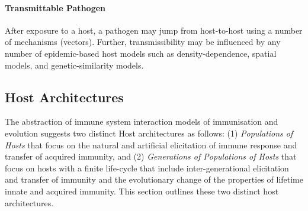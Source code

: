 \paragraph{Transmittable Pathogen}
After exposure to a host, a pathogen may jump from host-to-host using a number of mechanisms (vectors). Further, transmissibility may be influenced by any number of epidemic-based host models such as density-dependence, spatial models, and genetic-similarity models.	

%
%
\subsection{Host Architectures}
\label{sec:hosts:paradigm:architectures}
The abstraction of immune system interaction models of immunisation and evolution suggests two distinct Host architectures as follows: (1) \emph{Populations of Hosts} that focus on the natural and artificial elicitation of immune response and transfer of acquired immunity, and (2) \emph{Generations of Populations of Hosts} that focus on hosts with a finite life-cycle that include inter-generational elicitation and transfer of immunity and the evolutionary change of the properties of lifetime innate and acquired immunity. This section outlines these two distinct host architectures.

%
%
